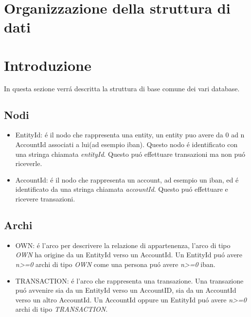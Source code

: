 \section{Organizzazione della struttura di dati}
\section{Introduzione}
In questa sezione verr\'a descritta la struttura di base comune dei vari database.
\subsection{Nodi}
\begin{itemize}
\item{EntityId:} \'e il nodo che rappresenta una entity, un entity puo avere da 0 ad n AccountId associati a lui(ad esempio iban). Questo nodo \'e identificato con una stringa chiamata \textit{entityId}. Questo pu\'o effettuare transazioni ma non pu\'o riceverle.

\item{AccountId:} \'e il nodo che rappresenta un account, ad esempio un iban, ed \'e identificato da una stringa chiamata \textit{accountId}. Questo pu\'o effettuare e ricevere transazioni.

\end{itemize}

\subsection{Archi}
\begin{itemize}
\item{OWN:} \'e l'arco per descrivere la relazione di appartenenza, l'arco di tipo  \textit{OWN} ha origine da un EntityId verso un AccountId. Un EntityId pu\'o avere \textit{n>=0} archi di tipo \textit{OWN} come una persona pu\'o avere \textit{n>=0} iban.
\item{TRANSACTION:} \'e l'arco che rappresenta una transazione. Una transazione pu\'o avvenire sia da un EntityId verso un AccountID, sia da un AccountId verso un altro AccountId. Un AccountId oppure un EntityId pu\'o avere \textit{n>=0} archi di tipo \textit{TRANSACTION}.

\end{itemize}